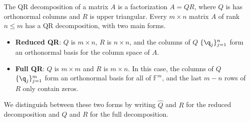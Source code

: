 \label{lab:QRdecomp}
\def\lvl#1{\multicolumn{1}{|c}{#1}} %
\def\rvl#1{\multicolumn{1}{c|}{#1}} %

The QR decomposition of a matrix $A$ is a factorization $A=QR$, where $Q$ is  has orthonormal columns and $R$ is upper triangular.
Every $m \times n$ matrix $A$ of rank $n \le m$ has a QR decomposition, with two main forms.
%
\begin{itemize}
    \item \textbf{Reduced QR}: $Q$ is $m \times n$, $R$ is $n \times n$, and the columns of $Q$ $\{\q_j\}_{j=1}^n$ form an orthonormal basis for the column space of $A$.
    \item \textbf{Full QR}: $Q$ is $m \times m$ and $R$ is $m \times n$.
    In this case, the columns of $Q$ $\{\q_j\}_{j=1}^m$ form an orthonormal basis for all of $\mathbb{F}^m$, and the last $m - n$ rows of $R$ only contain zeros.
\end{itemize}
We distinguish between these two forms by writing $\widehat{Q}$ and $\widehat{R}$ for the reduced decomposition and $Q$ and $R$ for the full decomposition.
%
